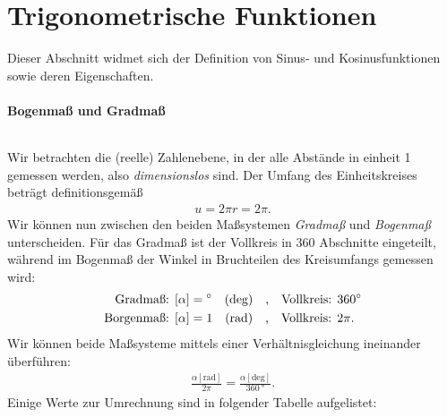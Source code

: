 \section{Trigonometrische Funktionen} 

Dieser Abschnitt widmet sich der Definition von Sinus- und Kosinusfunktionen sowie deren Eigenschaften. 

\paragraph{Bogenmaß und Gradmaß}$~$

\begin{wrapfigure}{r}{7cm}
    \centering
    \vspace{-1cm}
    \vspace{-3mm}
\end{wrapfigure}

Wir betrachten die (reelle) Zahlenebene, in der alle Abstände in einheit 1 gemessen werden, also \emph{dimensionslos} sind. Der Umfang des Einheitskreises beträgt definitionsgemäß 
\begin{align}
    u = 2\pi r = 2\pi.
\end{align}
Wir können nun zwischen den beiden Maßsystemen \emph{Gradmaß} und \emph{Bogenmaß} unterscheiden. Für das Gradmaß ist der Vollkreis in 360 Abschnitte eingeteilt, während im Bogenmaß der Winkel in Bruchteilen des Kreisumfangs gemessen wird:
\begin{align}
    \begin{split}
        \text{Gradmaß: } [\alpha] &= \si{\degree} \quad(\text{deg}) \qq{,} \text{Vollkreis: } \SI{360}{\degree}\\
        \text{Borgenmaß: } [\alpha] &= 1 \quad(\text{rad}) \qq{,} \text{Vollkreis: } 2\pi.
    \end{split}
\end{align}
Wir können beide Maßsysteme mittels einer Verhältnisgleichung ineinander überführen: 
\begin{align}
    \frac{\alpha [\text{rad}]}{2\pi} = \frac{\alpha [\text{deg}]}{\SI{360}{\degree}}.
\end{align}
Einige Werte zur Umrechnung sind in folgender Tabelle aufgelistet:

